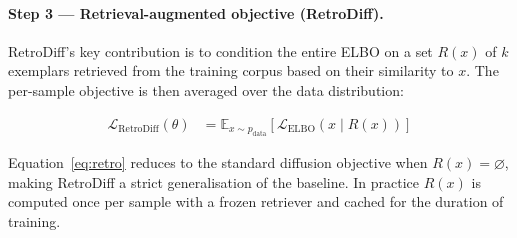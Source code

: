 \documentclass[11pt]{article}
\begin{document}
\paragraph{Step 3 — Retrieval-augmented objective (RetroDiff).}
RetroDiff's key contribution is to condition the entire ELBO on a set
$R(x)$ of $k$ exemplars retrieved from the training corpus based on
their similarity to $x$.  The per-sample objective is then averaged over
the data distribution:

\begin{align}
  \mathcal{L}_{\mathrm{RetroDiff}}(\theta)
    &= \mathbb{E}_{x \sim p_{\mathrm{data}}}\!\left[
         \mathcal{L}_{\mathrm{ELBO}}\!\left(x \;\big|\; R(x)\right)
       \right]
  \label{eq:retro}
\end{align}

Equation~\eqref{eq:retro} reduces to the standard diffusion objective
when $R(x) = \varnothing$, making RetroDiff a strict generalisation of
the baseline.  In practice $R(x)$ is computed once per sample with a
frozen retriever and cached for the duration of training.
\end{document}

